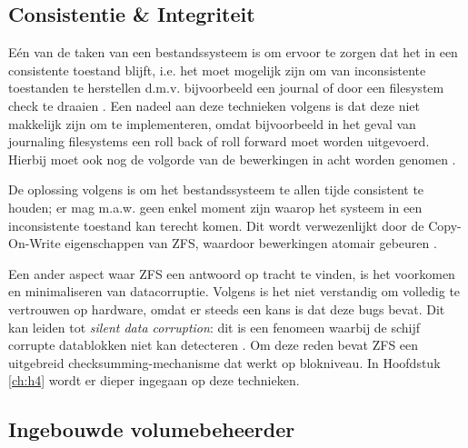 \subsection{Consistentie \& Integriteit}

Eén van de taken van een bestandssysteem is om ervoor te zorgen dat het in een consistente toestand blijft, i.e. het moet mogelijk zijn om van inconsistente toestanden te herstellen d.m.v. bijvoorbeeld een journal of door een filesystem check te draaien \autocite{OSThreePiecesRemzi2015}. Een nadeel aan deze technieken volgens \textcite{ZFSBonwick} is dat deze niet makkelijk zijn om te implementeren, omdat bijvoorbeeld in het geval van journaling filesystems een roll back of roll forward moet worden uitgevoerd. Hierbij moet ook nog de volgorde van de bewerkingen in acht worden genomen \autocite{OSThreePiecesRemzi2015}. 

De oplossing volgens \textcite{ZFSBonwick} is om het bestandssysteem te allen tijde consistent te houden; er mag m.a.w. geen enkel moment zijn waarop het systeem in een inconsistente toestand kan terecht komen. Dit wordt verwezenlijkt door de Copy-On-Write eigenschappen van ZFS, waardoor bewerkingen \gls{atomair} gebeuren \autocite{Li2009}. 

Een ander aspect waar ZFS een antwoord op tracht te vinden, is het voorkomen en minimaliseren van datacorruptie. Volgens \textcite{ZFSBonwick} is het niet verstandig om volledig te vertrouwen op hardware, omdat er steeds een kans is dat deze bugs bevat. Dit kan leiden tot \textit{silent data corruption}: dit is een fenomeen waarbij de schijf corrupte datablokken niet kan detecteren \autocite{OSThreePiecesRemzi2015}. Om deze reden bevat ZFS een uitgebreid checksumming-mechanisme dat werkt op blokniveau.
In Hoofdstuk \ref{ch:h4} wordt er dieper ingegaan op deze technieken.

\subsection{Ingebouwde volumebeheerder}


